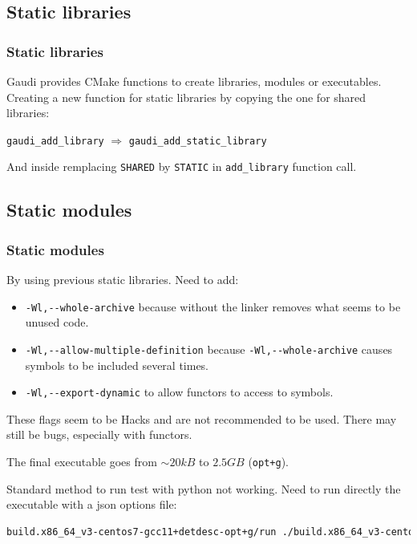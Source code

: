 \documentclass{beamer}
\begin{document}
    \subsection{Static libraries}

    \begin{frame}[fragile]
        \frametitle{Static libraries}

        Gaudi provides CMake functions to create libraries, modules or executables.
        Creating a new function for static libraries by copying the one for shared libraries:

        \verb'gaudi_add_library' $\Rightarrow$ \verb'gaudi_add_static_library'

        And inside remplacing \verb'SHARED' by \verb'STATIC' in \verb'add_library' function call.
    \end{frame}

    \subsection{Static modules}

    \begin{frame}[fragile]
        \frametitle{Static modules}

        By using previous static libraries.
        Need to add:
        \begin{itemize}
            \item \verb'-Wl,--whole-archive' because without the linker removes what seems to be unused code.
            \item \verb'-Wl,--allow-multiple-definition' because \verb'-Wl,--whole-archive' causes symbols to be included several times.
            \item \verb'-Wl,--export-dynamic' to allow functors to access to symbols.
        \end{itemize}

        These flags seem to be Hacks and are not recommended to be used.
        There may still be bugs, especially with functors.
    \end{frame}

    \begin{frame}[fragile]
        The final executable goes from $ \sim 20 kB $ to $ 2.5 GB $ (\verb'opt+g').

        Standard method to run test with python not working. Need to run directly the executable with a json options file:
        \begin{lstlisting}[language=bash,basicstyle=\scriptsize,breaklines]
            build.x86_64_v3-centos7-gcc11+detdesc-opt+g/run ./build.x86_64_v3-centos7-gcc11+detdesc-opt+g/Gaudi/Gaudi/Gaudi_static options.json
        \end{lstlisting}
    \end{frame}
\end{document}
